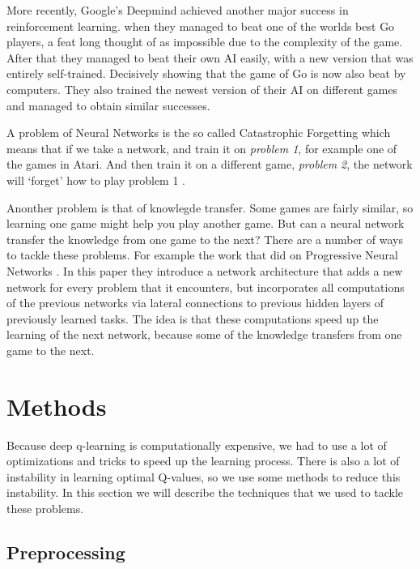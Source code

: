 \documentclass{article}
\begin{document}
More recently, Google's Deepmind achieved another major success in reinforcement learning. when they managed to beat one of the worlds best Go players, a feat long thought of as impossible due to the complexity of the game. After that they managed to beat their own AI easily, with a new version that was entirely self-trained. Decisively showing that the game of Go is now also beat by computers. They also trained the newest version of their AI on different games and managed to obtain similar successes.

A problem of Neural Networks is the so called Catastrophic Forgetting which means that if we take a network, and train it on \textit{problem 1}, for example one of the games in Atari. And then train it on a different game, \textit{problem 2}, the network will `forget' how to play problem 1 \cite{rusu2016progressive}.

Anonther problem is that of knowlegde transfer. Some games are fairly similar, so learning one game might help you play another game. But can a neural network transfer the knowledge from one game to the next? There are a number of ways to tackle these problems. For example the work that \citeauthor{rusu2016progressive} did on Progressive Neural Networks \cite{rusu2016progressive}. In this paper they introduce a network architecture that adds a new network for every problem that it encounters, but incorporates all computations of the previous networks via lateral connections to previous hidden layers of previously learned tasks. The idea is that these computations speed up the learning of the next network, because some of the knowledge transfers from one game to the next. 


\section{Methods}
Because deep q-learning is computationally expensive, we had to use a lot of optimizations and tricks to speed up the learning process. There is also a lot of instability in learning optimal Q-values, so we use some methods to reduce this instability. In this section we will describe the techniques that we used to tackle these problems.

\subsection{Preprocessing}
\end{document}
